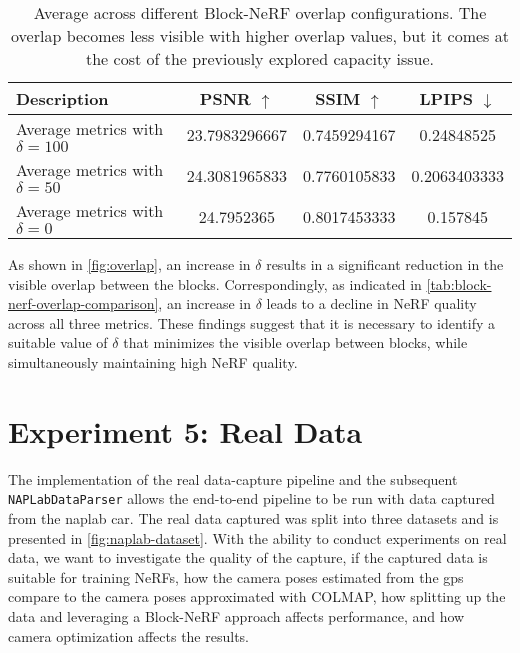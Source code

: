 \begin{table}[ht]
\centering
\setlength{\tabcolsep}{6pt}
\renewcommand{\arraystretch}{1.5}
\begin{tabular}{l | C{2.2} C{1.3} C{1.3}}
\hline
\textbf{Description} & \textbf{PSNR $\uparrow$} & \textbf{SSIM $\uparrow$} & \textbf{LPIPS $\downarrow$} \\
\hline
Average metrics with $\delta = 100$ &23.7983296667 &0.7459294167 &0.24848525 \\
Average metrics with $\delta = 50$  & 24.3081965833 & 0.7760105833 & 0.2063403333 \\
Average metrics with $\delta = 0$ &24.7952365 &0.8017453333 &0.157845 \\
\hline
\end{tabular}
\caption[Results for experiment 4.1: Improving Block-NeRF]{Average across different Block-NeRF overlap configurations. The overlap becomes less visible with higher overlap values, but it comes at the cost of the previously explored capacity issue.}
\label{tab:block-nerf-overlap-comparison}
\end{table}




As shown in \autoref{fig:overlap}, an increase in $\delta$ results in a significant reduction in the visible overlap between the blocks. Correspondingly, as indicated in \autoref{tab:block-nerf-overlap-comparison}, an increase in $\delta$ leads to a decline in NeRF quality across all three metrics. These findings suggest that it is necessary to identify a suitable value of $\delta$ that minimizes the visible overlap between blocks, while simultaneously maintaining high NeRF quality.
















\section{Experiment 5: Real Data}
The implementation of the real data-capture pipeline and the subsequent \texttt{NAPLabDataParser} allows the end-to-end pipeline to be run with data captured from the \acrshort{naplab} car. The real data captured was split into three datasets and is presented in \autoref{fig:naplab-dataset}. With the ability to conduct experiments on real data, we want to investigate the quality of the capture, if the captured data is suitable for training NeRFs, how the camera poses estimated from the \acrshort{gps} compare to the camera poses approximated with COLMAP, how splitting up the data and leveraging a Block-NeRF approach affects performance, and how camera optimization affects the results.

